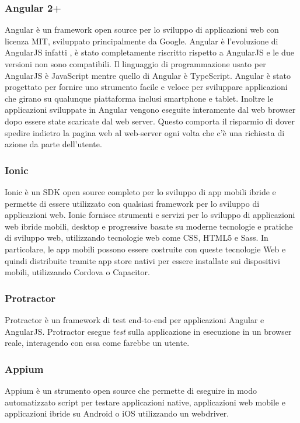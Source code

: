 \subsubsection*{Angular 2+}
Angular è un framework open source per lo sviluppo di applicazioni web con licenza MIT, sviluppato principalmente da Google. Angular è l'evoluzione di AngularJS infatti , è stato completamente riscritto rispetto a AngularJS e le due versioni non sono compatibili. Il linguaggio di programmazione usato per AngularJS è JavaScript mentre quello di Angular è TypeScript. Angular è stato progettato per fornire uno strumento facile e veloce per sviluppare applicazioni che girano su qualunque piattaforma inclusi smartphone e tablet. Inoltre le applicazioni sviluppate in Angular vengono eseguite interamente dal web browser dopo essere state scaricate dal web server. Questo comporta il risparmio di dover spedire indietro la pagina web al web-server ogni volta che c'è una richiesta di azione da parte dell'utente. 

\subsubsection*{Ionic}
Ionic è un SDK open source completo per lo sviluppo di app mobili ibride e permette di essere utilizzato con qualsiasi framework per lo sviluppo di applicazioni web. Ionic fornisce strumenti e servizi per lo sviluppo di applicazioni web ibride mobili, desktop e progressive basate su moderne tecnologie e pratiche di sviluppo web, utilizzando tecnologie web come CSS, HTML5 e Sass. In particolare, le app mobili possono essere costruite con queste tecnologie Web e quindi distribuite tramite app store nativi per essere installate sui dispositivi mobili, utilizzando Cordova o Capacitor. 

\subsubsection*{Protractor}
Protractor è un framework di test end-to-end per applicazioni Angular e AngularJS. Protractor esegue \emph{test} sulla applicazione in esecuzione in un browser reale, interagendo con essa come farebbe un utente.

\subsubsection*{Appium}
Appium è  un strumento  open source che permette di eseguire in modo automatizzato script per testare applicazioni native, applicazioni web mobile e applicazioni ibride su Android o iOS utilizzando un webdriver.

